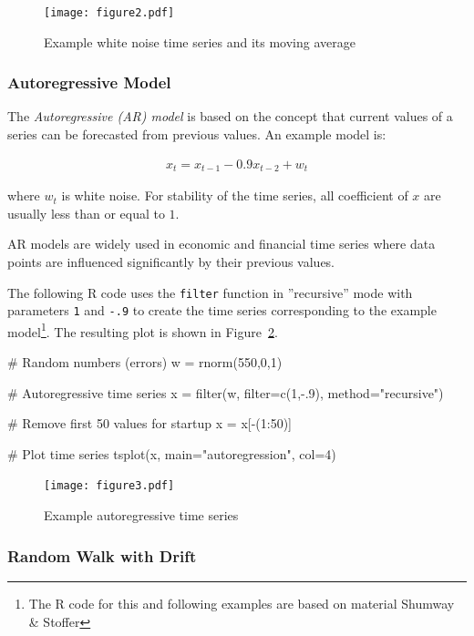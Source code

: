\begin{figure}
\centering

\texttt{[image: figure2.pdf]}
\caption{Example white noise time series and its moving average}
\label{fig:figure2}
\end{figure}

\subsubsection*{Autoregressive Model}

The \emph{Autoregressive (AR) model} is based on the concept that current values of a series can be forecasted from previous values. An example model is:

\begin{align*}x_t = x_{t-1} - 0.9 x_{t-2} + w_t\end{align*}


\noindent where $w_t$ is white noise. For stability of the time series, all coefficient of $x$ are usually less than or equal to $1$.

AR models are widely used in economic and financial time series where data points are influenced significantly by their previous values.

The following R code uses the \texttt{filter} function in ''recursive'' mode with parameters \texttt{1} and \texttt{-.9} to create the time series corresponding to the example model\footnote{The R code for this and following examples are based on material Shumway \& Stoffer}. The resulting plot is shown in Figure~\ref{fig:figure3}.

\begin{Rcode}
# Random numbers (errors)
w = rnorm(550,0,1)

# Autoregressive time series
x = filter(w, filter=c(1,-.9), method="recursive")

# Remove first 50 values for startup
x = x[-(1:50)]

# Plot time series
tsplot(x, main="autoregression", col=4)
\end{Rcode}

\begin{figure}
\centering

\texttt{[image: figure3.pdf]}
\caption{Example autoregressive time series}
\label{fig:figure3}
\end{figure}

\subsubsection*{Random Walk with Drift}

